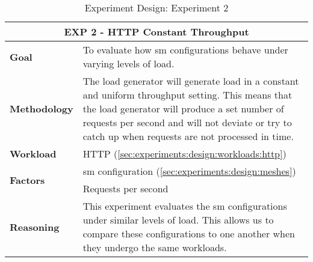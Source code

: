 \begin{table}[!t]
    \centering

    \begin{tabularx}{\textwidth}{l X}
    
        \toprule
        \multicolumn{2}{c}{\textbf{EXP 2 - HTTP Constant Throughput}}  \\
        \toprule
        
        \textbf{Goal}
        & To evaluate how \gls{sm} configurations behave under varying levels of load. \\
        \midrule
        
        \textbf{Methodology}
        & The load generator will generate load in a constant and uniform throughput setting. This means that the load generator will produce a set number of requests per second and will not deviate or try to catch up when requests are not processed in time.  \\
        \midrule
        
        \textbf{Workload} 
        & HTTP (\cref{sec:experiments:design:workloads:http}) \\
        \midrule

        \multirow{2}{*}{\textbf{Factors}} 
        & \Gls{sm} configuration (\cref{sec:experiments:design:meshes}) \\
        & Requests per second \\
        \midrule
        
        \textbf{Reasoning}
        & This experiment evaluates the \gls{sm} configurations under similar levels of load. This allows us to compare these configurations to one another when they undergo the same workloads.  \\

        \bottomrule

    \end{tabularx}
    \caption[Experiment Design: Experiment 2]{Experiment Design: Experiment 2}
    \label{tab:experiment:design:02}
\end{table}